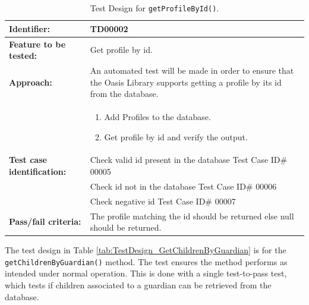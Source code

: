 \begin{table}[H]
	\centering
		\begin{tabular}{| p{4.5cm} | m{9cm} |}
			\hline
			\textbf{Identifier:}				& TD00002 \\ \hline
			\textbf{Feature to be tested:}		& Get profile by id. \\ \hline
			\textbf{Approach:}					& An automated test will be made in order to ensure that the Oasis Library supports getting a profile by its id from the database. \\
												&	\begin{enumerate}
														\item Add Profiles to the database.
														\item Get profile by id and verify the output.
												\end{enumerate} \\ \hline
			\textbf{Test case identification:}	& Check valid id present in the database Test Case ID\# 00005 \\
												& Check id not in the database Test Case ID\# 00006 \\
												& Check negative id Test Case ID\# 00007 \\ \hline
			\textbf{Pass/fail criteria:}		& The profile matching the id should be returned else null should be returned. \\ \hline
		\end{tabular}
	\caption{Test Design for \texttt{getProfileById()}.}
	\label{tab:TestDesign_GetProfileById}
\end{table}

The test design in Table \vref{tab:TestDesign_GetChildrenByGuardian} is for the \texttt{getChildrenByGuardian()} method.
The test ensures the method performs as intended under normal operation.
This is done with a single test-to-pass test, which tests if children associated to a guardian can be retrieved from the database.

